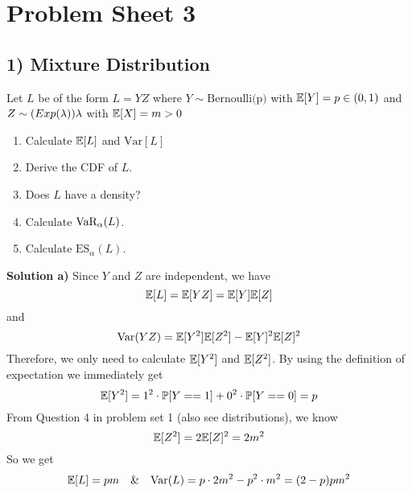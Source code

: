 %
%
\section*{Problem Sheet 3}
%
%
\subsection*{1) Mixture Distribution}
Let $L$ be of the form $L=YZ$ where $Y\sim \text{Bernoulli(p)}$ with $\mathbb{E}[Y]=p\in(0,1)$ and
$Z\sim \text(Exp(\lambda)){\lambda}$ with $\mathbb{E}[X] = m > 0$
\begin{enumerate}[label=(\alph*)]
    \item Calculate $\mathbb{E}[L]$ and $\text{Var}[L]$
    \item Derive the CDF of $L$.
    \item Does $L$ have a density?
    \item Calculate $\text{VaR}_\alpha(L)$.
    \item Calculate $\text{ES}_\alpha(L)$.
\end{enumerate}

\textbf{Solution a)} Since $Y$ and $Z$ are independent, we have
\[
    \mathbb{E}[L] = \mathbb{E}[YZ] = \mathbb{E}[Y]\mathbb{E}[Z]
\]
and
\[
    \text{Var}(YZ) = \mathbb{E}[Y^2]\mathbb{E}[Z^2] - \mathbb{E}[Y]^2\mathbb{E}[Z]^2
\]
Therefore, we only need to
calculate $\mathbb{E}[Y^2]$ and $\mathbb{E}[Z^2]$. By using the definition of expectation we
immediately get
\[
    \mathbb{E}[Y^2] = 1^2 \cdot \mathbb{P}[Y==1] + 0^2\cdot\mathbb{P}[Y==0] = p
\]
From Question 4 in problem set 1 (also see distributions), we know
\[
    \mathbb{E}[Z^2] = 2\mathbb{E}[Z]^2 = 2m^2
\]
So we get
\[
    \mathbb{E}[L] = pm \quad \text{\&} \quad \text{Var}(L) = p\cdot 2m^2 - p^2\cdot m^2
          = (2-p)pm^2
\]

